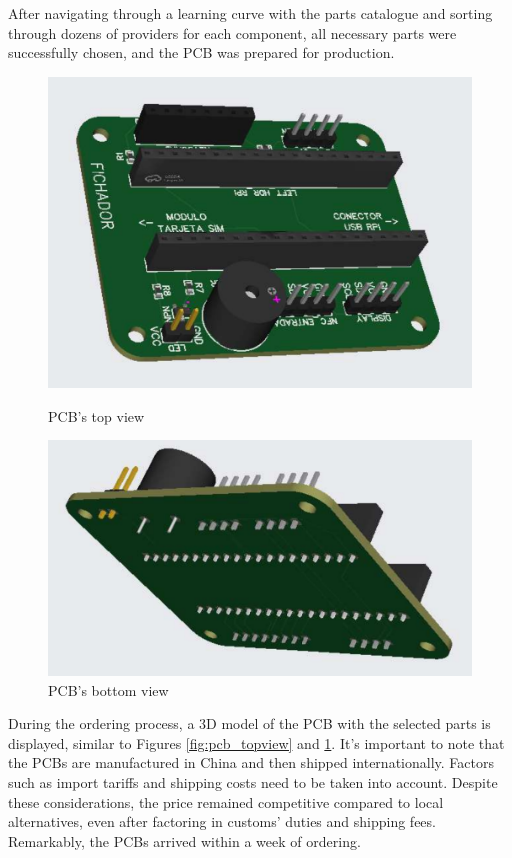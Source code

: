 After navigating through a learning curve with the parts catalogue and sorting through dozens of providers 
for each component, all necessary parts were successfully chosen, and the PCB was prepared for production.

\begin{figure}[h]
    \centering
    \begin{minipage}[b]{0.45\textwidth}
        \centering
        \includegraphics[width=.9\textwidth]{Imagenes/Vectorial/pcb1.pdf}
        \caption{PCB's top view}
        \label{fig:pcb_topview}
    \end{minipage}
    \hfill
    \begin{minipage}[b]{0.45\textwidth}
        \centering
        \includegraphics[width=.9\textwidth]{Imagenes/Vectorial/pcb2.pdf}
        \caption{PCB's bottom view}
        \label{fig:pcb_bottomview}
    \end{minipage}
\end{figure}

During the ordering process, a 3D model of the PCB with the selected parts is displayed, similar to Figures 
\ref{fig:pcb_topview} and \ref{fig:pcb_bottomview}. It's important to note that the PCBs are manufactured in 
China and then shipped internationally. Factors such as import tariffs and shipping costs need to be taken 
into account. Despite these considerations, the price remained competitive compared to local alternatives, 
even after factoring in customs' duties and shipping fees. Remarkably, the PCBs arrived within a week of 
ordering.

